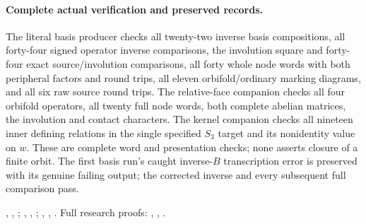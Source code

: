 \paragraph{Complete actual verification and preserved records.}
The literal basis producer checks all twenty-two inverse
basis compositions, all forty-four signed operator inverse
comparisons, the involution square and forty-four exact
source/involution comparisons, all forty whole node words
with both peripheral factors and round trips, all eleven
orbifold/ordinary marking diagrams, and all six raw source
round trips. The relative-face companion checks all four
orbifold operators, all twenty full node words, both complete
abelian matrices, the involution and contact characters.
The kernel companion checks all nineteen inner defining
relations in the single specified $S_3$ target and its
nonidentity value on $w$. These are complete word and
presentation checks; none asserts closure of a finite orbit.
The first basis run's caught inverse-$B$ transcription error
is preserved with its genuine failing output; the corrected
inverse and every subsequent full comparison pass.
\begingroup\raggedright\footnotesize
{},
,
;
,
,
;
,
,
.
Full research proofs:
,
,
.
\par\endgroup
